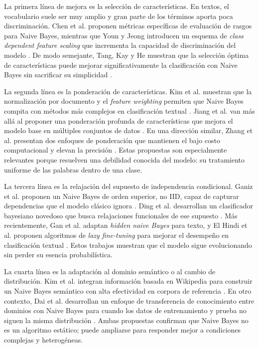 La primera línea de mejora es la selección de características. En textos, el vocabulario suele ser muy amplio y gran parte de los términos aporta poca discriminación. Chen et al. proponen métricas específicas de evaluación de rasgos para Naive Bayes, mientras que Youn y Jeong introducen un esquema de \textit{class dependent feature scaling} que incrementa la capacidad de discriminación del modelo \cite{CHEN20095432,YOUN2009477}. De modo semejante, Tang, Kay y He muestran que la selección óptima de características puede mejorar significativamente la clasificación con Naive Bayes sin sacrificar su simplicidad \cite{Tang20162508}.

La segunda línea es la ponderación de características. Kim et al. muestran que la normalización por documento y el \textit{feature weighting} permiten que Naive Bayes compita con métodos más complejos en clasificación textual \cite{Kim2006}. Jiang et al. van más allá al proponer una ponderación profunda de características que mejora el modelo base en múltiples conjuntos de datos \cite{Jiang2016}. En una dirección similar, Zhang et al. presentan dos enfoques de ponderación que mantienen el bajo costo computacional y elevan la precisión \cite{ZHANG2016137}. Estas propuestas son especialmente relevantes porque resuelven una debilidad conocida del modelo: su tratamiento uniforme de las palabras dentro de una clase.

La tercera línea es la relajación del supuesto de independencia condicional. Ganiz et al. proponen un Naive Bayes de orden superior, no IID, capaz de capturar dependencias que el modelo clásico ignora \cite{Ganiz20111022}. Ding et al. desarrollan un clasificador bayesiano novedoso que busca relajaciones funcionales de ese supuesto \cite{4554061}. Más recientemente, Gan et al. adaptan \textit{hidden naive Bayes} para texto, y El Hindi et al. proponen algoritmos de \textit{lazy fine-tuning} para mejorar el desempeño en clasificación textual \cite{Gan2021,ELHINDI2020106652}. Estos trabajos muestran que el modelo sigue evolucionando sin perder su esencia probabilística.

La cuarta línea es la adaptación al dominio semántico o al cambio de distribución. Kim et al. integran información basada en Wikipedia para construir un Naive Bayes semántico con alta efectividad en corpora de referencia \cite{KIM2018128}. En otro contexto, Dai et al. desarrollan un enfoque de transferencia de conocimiento entre dominios con Naive Bayes para cuando los datos de entrenamiento y prueba no siguen la misma distribución \cite{10.5555/1619645.1619732}. Ambas propuestas confirman que Naive Bayes no es un algoritmo estático; puede ampliarse para responder mejor a condiciones complejas y heterogéneas.

